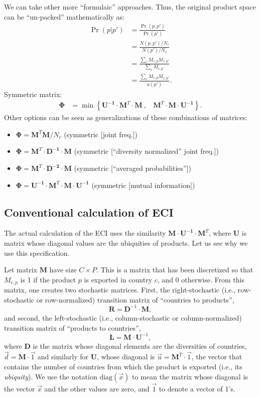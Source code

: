 \documentclass[12pt]{article}
\newcommand{\mtx}[1]{\mathbf{ #1}}
\newcommand{\diag}[1]{\mathrm{diag}\left( #1\right)}
\begin{document}
We can take other more ``formulaic'' approaches. Thus, the original product space can be ``un-packed'' mathematically as:
\begin{align}
	\Pr(p|p') &= \frac{\Pr(p,p')}{\Pr(p')} \nonumber \\
	&= \frac{N(p,p')/N_c}{N(p')/N_c} \nonumber \\
	&= \frac{\sum_c M_{c,p}M_{c,p'}}{\sum_c M_{c,p'}}  \nonumber \\
	&= \frac{\sum_c M_{c,p}M_{c,p'}}{u(p')}. 
\end{align}
Symmetric matrix:
\begin{align*}
	\mtx{\Phi} &= \min\left\{\mtx{U^{-1}}\cdot\mtx{M}^T\cdot\mtx{M}~,~~~~ \mtx{M}^T\cdot\mtx{M}\cdot\mtx{U^{-1}}\right\}.
\end{align*}
Other options can be seen as generalizations of these combinations of matrices:
\begin{itemize}
	\item $\mtx{\Phi} = \mtx{M}^T\mtx{M}/N_c$ (symmetric [joint freq.])
	\item $\mtx{\Phi} = \mtx{M}^T\cdot\mtx{D^{-1}}\cdot\mtx{M}$ (symmetric [``diversity normalized'' joint freq.])
	\item $\mtx{\Phi} = \mtx{M}^T\cdot\mtx{D^{-2}}\cdot\mtx{M}$ (symmetric [``averaged probabilities''])
	\item $\mtx{\Phi} = \mtx{U^{-1}}\cdot\mtx{M}^T\cdot\mtx{M}\cdot\mtx{U^{-1}}$ (symmetric [mutual information])
\end{itemize}

\subsection{Conventional calculation of ECI}
\label{sec:ECIdefinition}
The actual calculation of the ECI uses the similarity $\mtx{M}\cdot\mtx{U^{-1}}\cdot\mtx{M}^T$, where $\mtx{U}$ is matrix whose diagonal values are the ubiquities of products. Let us see why we use this specification. 

Let  matrix $\mtx{M}$ have size $C\times P$. This is a matrix that has been discretized so that $M_{c,p}$ is 1 if the product $p$ is exported in country $c$, and 0 otherwise. From this matrix, one creates two stochastic matrices. First, the right-stochastic (i.e., row-stochastic or row-normalized) transition matrix of ``countries to products'', $$\mtx{R}=\mtx{D}^{-1}\cdot\mtx{M},$$ and second, the left-stochastic (i.e., column-stochastic or column-normalized) transition matrix of ``products to countries'', $$\mtx{L}=\mtx{M}\cdot\mtx{U}^{-1},$$ where $\mtx{D}$ is the matrix whose diagonal elements are the diversities of countries, $\vec{d}=\mtx{M}\cdot\vec{1}$ and similarly for $\mtx{U}$, whose diagonal is $\vec{u}=\mtx{M}^T\cdot\vec{1}$, the vector that contains the number of countries from which the product is exported (i.e., its \emph{ubiquity}). We use the notation $\diag{\vec{x}}$ to mean the matrix whose diagonal is the vector $\vec{x}$ and the other values are zero, and $\vec{1}$ to denote a vector of 1's.
\end{document}
